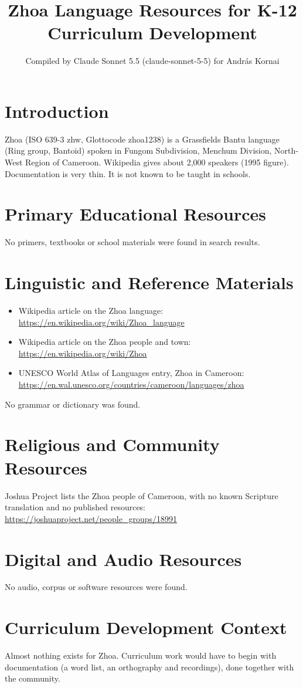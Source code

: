 \documentclass[12pt]{article}
\title{Zhoa Language Resources for K-12 Curriculum Development}
\author{Compiled by Claude Sonnet 5.5 (claude-sonnet-5-5) for Andr\'as Kornai}
\date{}
\begin{document}
\maketitle

\section{Introduction}
Zhoa (ISO 639-3 zhw, Glottocode zhoa1238) is a Grassfields Bantu language (Ring group, Bantoid) spoken in Fungom Subdivision, Menchum Division, North-West Region of Cameroon. Wikipedia gives about 2,000 speakers (1995 figure). Documentation is very thin. It is not known to be taught in schools.

\section{Primary Educational Resources}
No primers, textbooks or school materials were found in search results.

\section{Linguistic and Reference Materials}
\begin{itemize}
\item Wikipedia article on the Zhoa language: \url{https://en.wikipedia.org/wiki/Zhoa_language}
\item Wikipedia article on the Zhoa people and town: \url{https://en.wikipedia.org/wiki/Zhoa}
\item UNESCO World Atlas of Languages entry, Zhoa in Cameroon: \url{https://en.wal.unesco.org/countries/cameroon/languages/zhoa}
\end{itemize}
No grammar or dictionary was found.

\section{Religious and Community Resources}
Joshua Project lists the Zhoa people of Cameroon, with no known Scripture translation and no published resources: \url{https://joshuaproject.net/people_groups/18991}

\section{Digital and Audio Resources}
No audio, corpus or software resources were found.

\section{Curriculum Development Context}
Almost nothing exists for Zhoa. Curriculum work would have to begin with documentation (a word list, an orthography and recordings), done together with the community.
\end{document}
